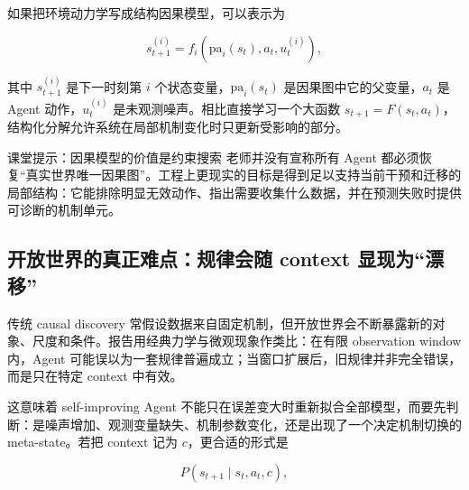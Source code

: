 

如果把环境动力学写成结构因果模型，可以表示为

$$
s_{t+1}^{(i)}=f_i\!\left(\mathrm{pa}_i(s_t),a_t,u_t^{(i)}\right),
$$

其中 $s_{t+1}^{(i)}$ 是下一时刻第 $i$ 个状态变量，$\mathrm{pa}_i(s_t)$ 是因果图中它的父变量，$a_t$ 是 Agent 动作，$u_t^{(i)}$ 是未观测噪声。相比直接学习一个大函数 $s_{t+1}=F(s_t,a_t)$，结构化分解允许系统在局部机制变化时只更新受影响的部分。

\begin{knowledgebox}{课堂提示：因果模型的价值是约束搜索}
老师并没有宣称所有 Agent 都必须恢复“真实世界唯一因果图”。工程上更现实的目标是得到足以支持当前干预和迁移的局部结构：它能排除明显无效动作、指出需要收集什么数据，并在预测失败时提供可诊断的机制单元。
\end{knowledgebox}


\subsection{开放世界的真正难点：规律会随 context 显现为“漂移”}

传统 causal discovery 常假设数据来自固定机制，但开放世界会不断暴露新的对象、尺度和条件。报告用经典力学与微观现象作类比：在有限 observation window 内，Agent 可能误以为一套规律普遍成立；当窗口扩展后，旧规律并非完全错误，而是只在特定 context 中有效。



这意味着 self-improving Agent 不能只在误差变大时重新拟合全部模型，而要先判断：是噪声增加、观测变量缺失、机制参数变化，还是出现了一个决定机制切换的 meta-state。若把 context 记为 $c$，更合适的形式是

$$
P(s_{t+1}\mid s_t,a_t,c),
$$

